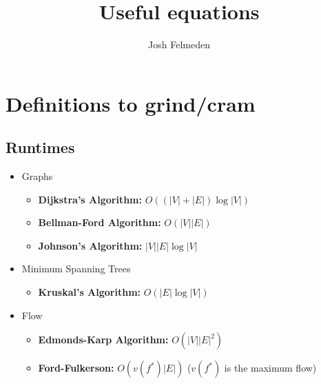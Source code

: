 \documentclass[11pt,fleqn,a4paper,titlepage,dvipsnames,cmyk]{scrartcl}
\title{Useful equations}
\author{Josh Felmeden}
\begin{document}
\tableofcontents
\newpage

\section{Definitions to grind/cram}%
\label{sec:defs}
\subsection{Runtimes}%
\label{sub:Runtimes}
\begin{itemize}
    \item Graphs
        \begin{itemize}
            \item \textbf{Dijkstra's Algorithm:} $O((|V|+|E|)\log |V|)$
            \item \textbf{Bellman-Ford Algorithm:} $O(|V||E|)$
            \item \textbf{Johnson's Algorithm:} $|V||E|\log|V|$
        \end{itemize}
    \item Minimum Spanning Trees
        \begin{itemize}
            \item \textbf{Kruskal's Algorithm:} $O(|E|\log|V|)$
        \end{itemize}
    \item Flow
        \begin{itemize}
            \item \textbf{Edmonds-Karp Algorithm:} $O(|V||E|^2)$
            \item \textbf{Ford-Fulkerson:} $O(v(f^*)|E|)$ ($v(f^*)$ is
                the maximum flow)
        \end{itemize}
\end{itemize}
\end{document}

